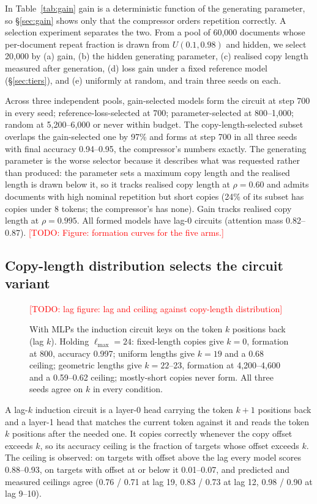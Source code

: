 \documentclass[11pt]{article}
\newcommand{\todo}[1]{\textcolor{red}{[TODO: #1]}}
\begin{document}
In Table~\ref{tab:gain} gain is a deterministic function of the generating
parameter, so \S\ref{sec:gain} shows only that the compressor orders
repetition correctly. A selection experiment separates the two. From a pool
of 60,000 documents whose per-document repeat fraction is drawn from
$U(0.1, 0.98)$ and hidden, we select 20,000 by (a) gain, (b) the hidden
generating parameter, (c) realised copy length measured after generation,
(d) loss gain under a fixed reference model (\S\ref{sec:tiers}), and (e)
uniformly at random, and train three seeds on each.

Across three independent pools, gain-selected models form the circuit at
step 700 in every seed; reference-loss-selected at 700; parameter-selected
at 800--1,000; random at 5,200--6,000 or never within budget. The
copy-length-selected subset overlaps the gain-selected one by 97\% and
forms at step 700 in all three seeds with final accuracy 0.94--0.95, the
compressor's numbers exactly. The generating parameter is the worse
selector because it describes what was requested rather than produced: the
parameter sets a maximum copy length and the realised length is drawn below
it, so it tracks realised copy length at $\rho=0.60$ and admits documents
with high nominal repetition but short copies (24\% of its subset has copies
under 8 tokens; the compressor's has none). Gain tracks realised copy length
at $\rho=0.995$. All formed models have lag-0 circuits (attention mass
0.82--0.87). \todo{Figure: formation curves for the five arms.}

\subsection{Copy-length distribution selects the circuit variant}
\label{sec:lag}

\begin{figure}[t]\centering
\todo{lag figure: lag and ceiling against copy-length distribution}
\caption{With MLPs the induction circuit keys on the token $k$ positions
back (lag $k$). Holding $\ell_{\max}=24$: fixed-length copies give $k=0$,
formation at 800, accuracy 0.997; uniform lengths give $k=19$ and a 0.68
ceiling; geometric lengths give $k=22$--23, formation at 4,200--4,600 and a
0.59--0.62 ceiling; mostly-short copies never form. All three seeds agree
on $k$ in every condition.}
\label{fig:lag}
\end{figure}

A lag-$k$ induction circuit is a layer-0 head carrying the token $k+1$
positions back and a layer-1 head that matches the current token against
it and reads the token $k$ positions after the needed one. It copies
correctly whenever the copy offset exceeds $k$, so its accuracy ceiling is
the fraction of targets whose offset exceeds $k$. The ceiling is observed:
on targets with offset above the lag every model scores 0.88--0.93, on
targets with offset at or below it 0.01--0.07, and predicted and measured
ceilings agree (0.76 / 0.71 at lag 19, 0.83 / 0.73 at lag 12, 0.98 / 0.90
at lag 9--10).
\end{document}
